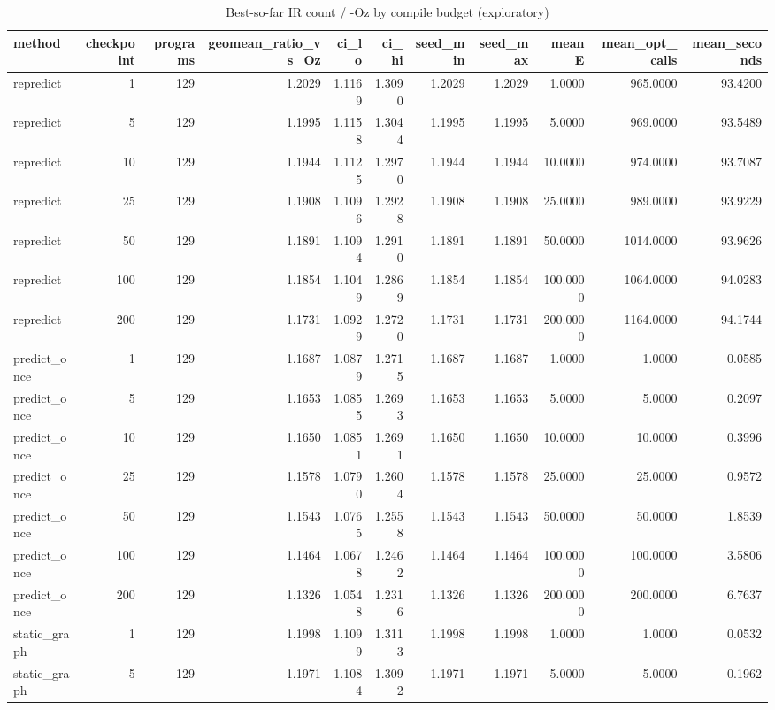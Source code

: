 \begin{table}[t]
\centering
\caption{Best-so-far IR count / -Oz by compile budget (exploratory)}
\label{tab:v3-1-budget-curves}
\begin{tabular}{lrrrrrrrrrr}
\toprule
method & checkpoint & programs & geomean\_ratio\_vs\_Oz & ci\_lo & ci\_hi & seed\_min & seed\_max & mean\_E & mean\_opt\_calls & mean\_seconds \\
\midrule
repredict & 1 & 129 & 1.2029 & 1.1169 & 1.3090 & 1.2029 & 1.2029 & 1.0000 & 965.0000 & 93.4200 \\
repredict & 5 & 129 & 1.1995 & 1.1158 & 1.3044 & 1.1995 & 1.1995 & 5.0000 & 969.0000 & 93.5489 \\
repredict & 10 & 129 & 1.1944 & 1.1125 & 1.2970 & 1.1944 & 1.1944 & 10.0000 & 974.0000 & 93.7087 \\
repredict & 25 & 129 & 1.1908 & 1.1096 & 1.2928 & 1.1908 & 1.1908 & 25.0000 & 989.0000 & 93.9229 \\
repredict & 50 & 129 & 1.1891 & 1.1094 & 1.2910 & 1.1891 & 1.1891 & 50.0000 & 1014.0000 & 93.9626 \\
repredict & 100 & 129 & 1.1854 & 1.1049 & 1.2869 & 1.1854 & 1.1854 & 100.0000 & 1064.0000 & 94.0283 \\
repredict & 200 & 129 & 1.1731 & 1.0929 & 1.2720 & 1.1731 & 1.1731 & 200.0000 & 1164.0000 & 94.1744 \\
predict\_once & 1 & 129 & 1.1687 & 1.0879 & 1.2715 & 1.1687 & 1.1687 & 1.0000 & 1.0000 & 0.0585 \\
predict\_once & 5 & 129 & 1.1653 & 1.0855 & 1.2693 & 1.1653 & 1.1653 & 5.0000 & 5.0000 & 0.2097 \\
predict\_once & 10 & 129 & 1.1650 & 1.0851 & 1.2691 & 1.1650 & 1.1650 & 10.0000 & 10.0000 & 0.3996 \\
predict\_once & 25 & 129 & 1.1578 & 1.0790 & 1.2604 & 1.1578 & 1.1578 & 25.0000 & 25.0000 & 0.9572 \\
predict\_once & 50 & 129 & 1.1543 & 1.0765 & 1.2558 & 1.1543 & 1.1543 & 50.0000 & 50.0000 & 1.8539 \\
predict\_once & 100 & 129 & 1.1464 & 1.0678 & 1.2462 & 1.1464 & 1.1464 & 100.0000 & 100.0000 & 3.5806 \\
predict\_once & 200 & 129 & 1.1326 & 1.0548 & 1.2316 & 1.1326 & 1.1326 & 200.0000 & 200.0000 & 6.7637 \\
static\_graph & 1 & 129 & 1.1998 & 1.1099 & 1.3113 & 1.1998 & 1.1998 & 1.0000 & 1.0000 & 0.0532 \\
static\_graph & 5 & 129 & 1.1971 & 1.1084 & 1.3092 & 1.1971 & 1.1971 & 5.0000 & 5.0000 & 0.1962 \\

\end{tabular}
\end{table}
